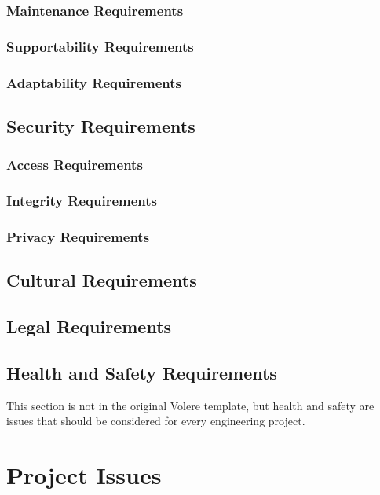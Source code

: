 \documentclass[12pt, titlepage]{article}
\begin{document}
\subsubsection{Maintenance Requirements}

\subsubsection{Supportability Requirements}

\subsubsection{Adaptability Requirements}

\subsection{Security Requirements}

\subsubsection{Access Requirements}

\subsubsection{Integrity Requirements}

\subsubsection{Privacy Requirements}

\subsection{Cultural Requirements}

\subsection{Legal Requirements}

\subsection{Health and Safety Requirements}

This section is not in the original Volere template, but health and safety are
issues that should be considered for every engineering project.

\section{Project Issues}
\end{document}
